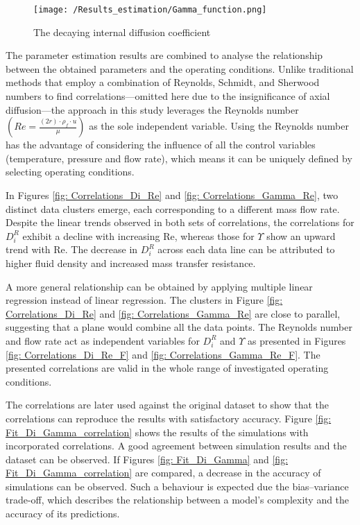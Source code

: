 \documentclass[../Supercritical_fluid_extraction_of_essential_oil_from_chamomile.tex]{subfiles}
\begin{document}
	\begin{figure}[!h]
		\centering
		\texttt{[image: /Results\_estimation/Gamma\_function.png]}
		\caption{The decaying internal diffusion coefficient}
		\label{fig: Gamma_function}
	\end{figure}
		
	\fi	
	The parameter estimation results are combined to analyse the relationship between the obtained parameters and the operating conditions. Unlike traditional methods that employ a combination of Reynolds, Schmidt, and Sherwood numbers to find correlations—omitted here due to the insignificance of axial diffusion—the approach in this study leverages the Reynolds number $\left(Re = \frac{(2r) \cdot \rho_f \cdot u}{\mu}\right)$ as the sole independent variable. Using the Reynolds number has the advantage of considering the influence of all the control variables (temperature, pressure and flow rate), which means it can be uniquely defined by selecting operating conditions.	
	
	In Figures \ref{fig: Correlations_Di_Re} and \ref{fig: Correlations_Gamma_Re}, two distinct data clusters emerge, each corresponding to a different mass flow rate. Despite the linear trends observed in both sets of correlations, the correlations for $D_i^R$ exhibit a decline with increasing Re, whereas those for $\Upsilon$ show an upward trend with Re. The decrease in $D_i^R$ across each data line can be attributed to higher fluid density and increased mass transfer resistance. %
	
	A more general relationship can be obtained by applying multiple linear regression instead of linear regression. The clusters in Figure \ref{fig: Correlations_Di_Re}  and \ref{fig: Correlations_Gamma_Re} are close to parallel, suggesting that a plane would combine all the data points. The Reynolds number and flow rate act as independent variables for $D_i^R$ and $\Upsilon$ as presented in Figures \ref{fig: Correlations_Di_Re_F} and \ref{fig: Correlations_Gamma_Re_F}. The presented correlations are valid in the whole range of investigated operating conditions.

	The correlations are later used against the original dataset to show that the correlations can reproduce the results with satisfactory accuracy. Figure \ref{fig: Fit_Di_Gamma_correlation} shows the results of the simulations with incorporated correlations. A good agreement between simulation results and the dataset can be observed. If Figures \ref{fig: Fit_Di_Gamma} and \ref{fig: Fit_Di_Gamma_correlation} are compared, a decrease in the accuracy of simulations can be observed. Such a behaviour is expected due the bias–variance trade-off, which describes the relationship between a model's complexity and the accuracy of its predictions.
	
\end{document}
